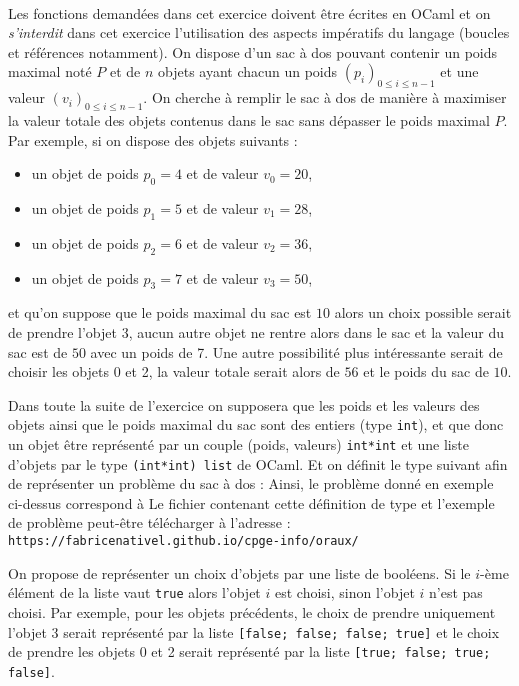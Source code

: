 \documentclass[11pt,a4paper]{article}
\begin{document}
\begin{Exercise*}[title={Exercice B}]\\
	Les fonctions demandées dans cet exercice doivent être écrites en OCaml et on \textit{s'interdit} dans cet exercice l'utilisation des aspects impératifs du langage (boucles et références notamment).
	On dispose d'un sac à dos pouvant contenir un poids maximal noté $P$ et de $n$ objets ayant chacun un poids $\left(p_i\right)_{0\leqslant i \leqslant n-1}$ et une valeur $\left(v_i\right)_{0\leqslant i \leqslant n-1}$. On cherche à remplir le sac à dos de manière à maximiser la valeur totale des objets contenus dans le sac sans dépasser le poids maximal $P$.
	Par exemple, si on dispose des objets suivants :
	\begin{itemize}
		\item un objet de poids $p_0 = 4$ et de valeur $v_0 = 20$,
		\item un objet de poids $p_1 = 5$ et de valeur $v_1 = 28$,
		\item un objet de poids $p_2 = 6$ et de valeur $v_2 = 36$,
		\item un objet de poids $p_3 = 7$ et de valeur $v_3 = 50$,
	\end{itemize}
	et qu'on suppose que le poids maximal du sac est $10$ alors un choix possible serait de prendre l'objet 3, aucun autre objet ne rentre alors dans le sac et la valeur du sac est  de $50$ avec un poids de 7. Une autre possibilité plus intéressante serait de choisir les objets 0  et 2, la valeur totale serait alors de $56$ et le poids du sac de $10$.\smallskip

	Dans toute la suite de l'exercice on supposera que les poids et les valeurs des objets ainsi que le poids maximal du sac sont des entiers (type {\tt int}), et que donc un objet  être représenté par un couple (poids, valeurs) {\tt int*int} et une liste d'objets par le type {\tt (int*int) list} de OCaml. Et on définit le type suivant afin de représenter un problème du sac à dos :
	Ainsi, le problème donné en exemple ci-dessus correspond à
	Le fichier contenant cette définition de type et l'exemple de problème peut-être télécharger à l'adresse : {\tt https://fabricenativel.github.io/cpge-info/oraux/}

	On propose de représenter un choix d'objets par une liste de booléens. Si le $i$-ème élément de la liste vaut {\tt true} alors l'objet $i$ est choisi, sinon l'objet $i$ n'est pas choisi. Par exemple, pour les objets précédents, le choix de prendre uniquement l'objet 3 serait représenté par la liste \texttt{[false; false; false; true]} et le choix de prendre les objets 0 et 2 serait représenté par la liste \texttt{[true; false; true; false]}.


\end{Exercise*}
\end{document}
